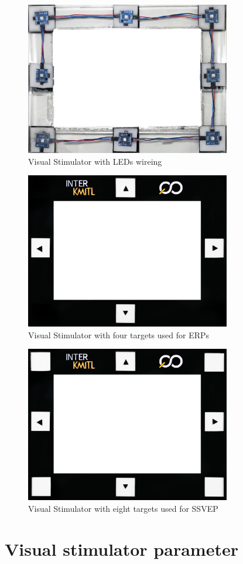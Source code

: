 \begin{figure}[ht]
	\centering
	\includegraphics[width=0.8\textwidth]{chapter6/frame_LED.jpg}
	\caption{Visual Stimulator with LEDs wireing}
\end{figure}

\begin{figure}[ht]
	\centering
	\includegraphics[width=0.8\textwidth]{chapter7/frame_4.jpg}
	\caption{Visual Stimulator with four targets used for ERPs}
\end{figure}

\begin{figure}[ht]
	\centering
	\includegraphics[width=0.8\textwidth]{chapter7/frame_8.jpg}
	\caption{Visual Stimulator with eight targets used for SSVEP}
\end{figure}

\section{Visual stimulator parameter}